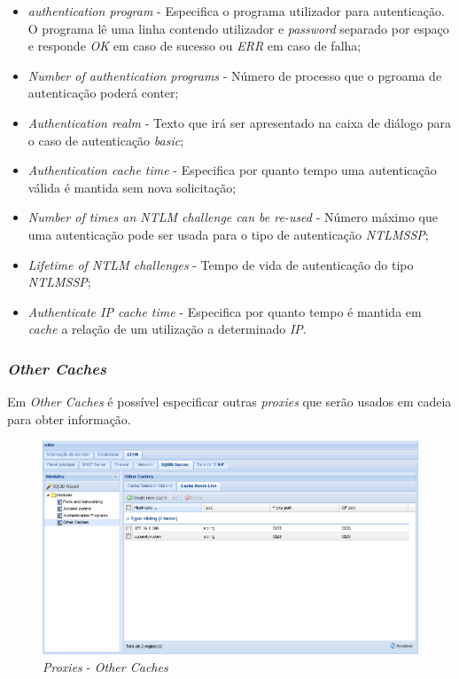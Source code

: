 \begin{itemize}
    \item \textit{authentication program} - Especifica o programa utilizador para autenticação. O programa lê uma linha contendo utilizador e \textit{password} separado por espaço e responde \textit{OK} em caso de sucesso ou \textit{ERR} em caso de falha;
    \item \textit{Number of authentication programs} - Número de processo que o pgroama de autenticação poderá conter;
    \item \textit{Authentication realm} - Texto que irá ser apresentado na caixa de diálogo para o caso de autenticação \textit{basic};
    \item \textit{Authentication cache time} - Especifica por quanto tempo uma autenticação válida é mantida sem nova solicitação;
    \item \textit{Number of times an NTLM challenge can be re-used} - Número máximo que uma autenticação pode ser usada para o tipo de autenticação \textit{NTLMSSP};
    \item \textit{Lifetime of NTLM challenges} - Tempo de vida de autenticação do tipo \textit{NTLMSSP};
    \item \textit{Authenticate IP cache time} - Especifica por quanto tempo é mantida em \textit{cache} a relação de um utilização a determinado \textit{IP}.
\end{itemize}

\subsubsection{\textit{Other Caches}}

Em \textit{Other Caches} é possível especificar outras \textit{proxies} que serão usados em cadeia para obter informação.

\begin{figure}[H]
    \begin{center}
    \includegraphics[scale=0.38]{screenshots/etfw/etfw_squid_othercaches_01.png}
    \caption{\textit{Proxies} - \textit{Other Caches}}
    \label{fig:etfw_squid_othercaches_01}
    \end{center}
\end{figure}


